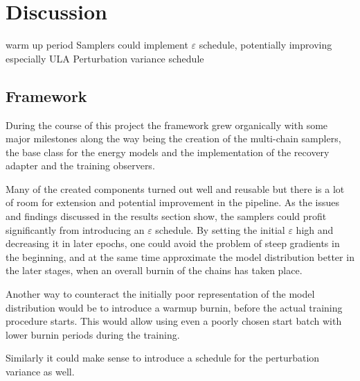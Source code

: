 
\section{Discussion}
warm up period
Samplers could implement $\varepsilon$ schedule, potentially improving especially ULA
Perturbation variance schedule


\subsection{Framework}
During the course of this project the framework grew organically with some major milestones along the way being the creation of the multi-chain samplers, 
the base class for the energy models and the implementation of the recovery adapter and the training observers.

Many of the created components turned out well and reusable but there is a lot of room for extension and potential improvement in the pipeline.
As the issues and findings discussed in the results section show, the samplers could profit significantly from introducing an $\varepsilon$ schedule.
By setting the initial $\varepsilon$ high and decreasing it in later epochs, one could avoid the problem of steep gradients in the beginning,
and at the same time approximate the model distribution better in the later stages, when an overall burnin of the chains has taken place.

Another way to counteract the initially poor representation of the model distribution would be to introduce a warmup burnin, before the actual training procedure starts.
This would allow using even a poorly chosen start batch with lower burnin periods during the training.

Similarly it could make sense to introduce a schedule for the perturbation variance as well.

